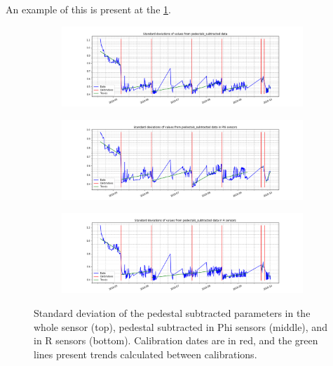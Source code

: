 An example of this is present at the \ref{plot:wtte1-stdevs}.
\begin{figure}
\centering
\begin{subfigure}[b]{0.85\textwidth}
    \centering
    \includegraphics[width=\linewidth]{figures/chapter4/wtte/stdevs_trends_calibs.png}
    \label{plot:wtte1-stdevs}
  \end{subfigure}

\begin{subfigure}[b]{0.85\textwidth}
    \centering
    \includegraphics[width=\linewidth]{figures/chapter4/wtte/pstdevs_trends_calibs.png}
    \label{plot:wtte1-p-stdevs}
  \end{subfigure}

\begin{subfigure}[b]{0.85\textwidth}
    \centering
    \includegraphics[width=\linewidth]{figures/chapter4/wtte/rstdevs_trends_calibs.png}
    \label{plot:wtte1-r-stdevs}
  \end{subfigure}
  \caption[Two numerical solutions]{ Standard deviation of the pedestal subtracted parameters in the whole sensor (top), pedestal subtracted in Phi sensors (middle), and in R sensors (bottom).
  Calibration dates are in red, and the green lines present trends calculated between calibrations.}
\end{figure}

